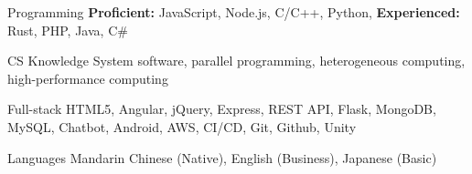 
\begin{cvskills}
    \cvskill
    {Programming} %
    {\textbf{Proficient:} JavaScript, Node.js, C/C++, Python, \textbf{Experienced:} Rust, PHP, Java, C\#} %
    
    \cvskill
    {CS Knowledge} %
    {System software, parallel programming, heterogeneous computing, high-performance computing} %

      \cvskill
        {Full-stack} %
        {HTML5, Angular, jQuery, Express, REST API, Flask, MongoDB, MySQL, Chatbot, Android, AWS, CI/CD, Git, Github, Unity} %

      \cvskill
        {Languages} %
        {Mandarin Chinese (Native), English (Business), Japanese (Basic)} %
    
\end{cvskills}
